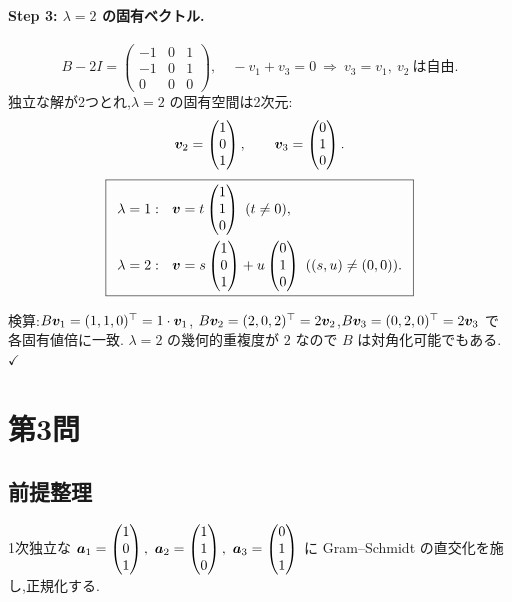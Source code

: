 \documentclass[11pt,a4paper]{article}
\begin{document}
\paragraph{Step 3: $\lambda=2$ の固有ベクトル.}
\[
B-2I=\begin{pmatrix}-1&0&1\\-1&0&1\\0&0&0\end{pmatrix},\quad
-v_1+v_3=0\ \Rightarrow\ v_3=v_1,\ v_2\ \text{は自由}.
\]
独立な解が2つとれ,$\lambda=2$ の固有空間は2次元:
\[
\bm{v}_2=\begin{pmatrix}1\\0\\1\end{pmatrix},\qquad
\bm{v}_3=\begin{pmatrix}0\\1\\0\end{pmatrix}.
\]
\[
\ans{\
\begin{aligned}
&\lambda=1:\ \ \vv=t\begin{pmatrix}1\\1\\0\end{pmatrix}\ (t\neq0),\\
&\lambda=2:\ \ \vv=s\begin{pmatrix}1\\0\\1\end{pmatrix}+u\begin{pmatrix}0\\1\\0\end{pmatrix}\ ((s,u)\neq(0,0)).
\end{aligned}\ }
\]

検算:$B\bm{v}_1=(1,1,0)^\top=1\cdot\bm{v}_1$,
$B\bm{v}_2=(2,0,2)^\top=2\bm{v}_2$,$B\bm{v}_3=(0,2,0)^\top=2\bm{v}_3$ で各固有値倍に一致.
$\lambda=2$ の幾何的重複度が $2$ なので $B$ は対角化可能でもある.$\checkmark$

\section*{第3問}

\subsection*{前提整理}

1次独立な
$\bm{a}_1=\begin{pmatrix}1\\0\\1\end{pmatrix},\
\bm{a}_2=\begin{pmatrix}1\\1\\0\end{pmatrix},\
\bm{a}_3=\begin{pmatrix}0\\1\\1\end{pmatrix}$
に Gram--Schmidt の直交化を施し,正規化する.
\end{document}
